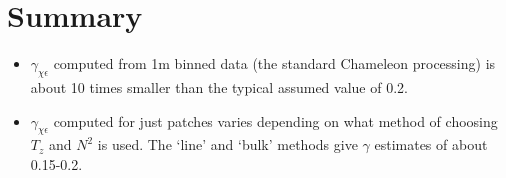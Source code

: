 \documentclass[11pt]{article}
\begin{document}
%
%
%




\clearpage
\section{Summary}

\begin{itemize}
\item $\gamma_{\chi\epsilon}$ computed from 1m binned data (the standard Chameleon processing) is about 10 times smaller than the typical assumed value of 0.2.
\item $\gamma_{\chi\epsilon}$ computed for just patches varies depending on what method of choosing $T_z$ and $N^2$ is used. The `line' and `bulk' methods give $\gamma$ estimates of about 0.15-0.2. 
\end{itemize}
\end{document}
